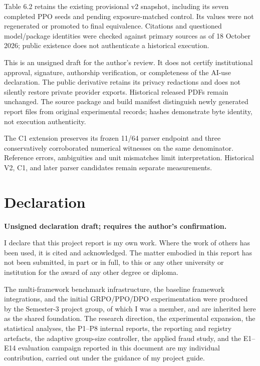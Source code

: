 Table 6.2 retains the existing provisional v2 snapshot, including its seven completed PPO seeds and pending exposure-matched control. Its values were not regenerated or promoted to final equivalence. Citations and questioned model/package identities were checked against primary sources as of 18 October 2026; public existence does not authenticate a historical execution.

This is an unsigned draft for the author's review. It does not certify institutional approval, signature, authorship verification, or completeness of the AI-use declaration. The public derivative retains its privacy redactions and does not silently restore private provider exports. Historical released PDFs remain unchanged. The source package and build manifest distinguish newly generated report files from original experimental records; hashes demonstrate byte identity, not execution authenticity.

The C1 extension preserves its frozen 11/64 parser endpoint and three conservatively corroborated numerical witnesses on the same denominator. Reference errors, ambiguities and unit mismatches limit interpretation. Historical V2, C1, and later parser candidates remain separate measurements.

\chapter*{Declaration}
\thispagestyle{plain}
\textbf{Unsigned declaration draft; requires the author's confirmation.}

I declare that this project report is my own work. Where the work of others has
been used, it is cited and acknowledged. The matter embodied in this report has
not been submitted, in part or in full, to this or any other university or
institution for the award of any other degree or diploma.

The multi-framework benchmark infrastructure, the baseline framework
integrations, and the initial GRPO/PPO/DPO experimentation were produced by the
Semester-3 project group, of which I was a member, and are inherited here as
the shared foundation. The research direction, the experimental expansion, the
statistical analyses, the P1--P8 internal reports, the reporting and registry
artefacts, the adaptive group-size controller, the applied fraud study, and the
E1--E14 evaluation campaign reported in this document are my
individual contribution, carried out under the guidance of my project guide.

